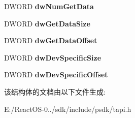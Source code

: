 \begin{DoxyCompactItemize}
\mbox{\label{structphonecaps__tag_ad605900d64527910c035e6764a85fa90}} 
D\+W\+O\+RD {\bfseries dw\+Num\+Get\+Data}
\item 
\mbox{\label{structphonecaps__tag_a48dd154d26c20254d583b17dc4f31eed}} 
D\+W\+O\+RD {\bfseries dw\+Get\+Data\+Size}
\item 
\mbox{\label{structphonecaps__tag_aa0b172be716dd7761552d176e5b92d79}} 
D\+W\+O\+RD {\bfseries dw\+Get\+Data\+Offset}
\item 
\mbox{\label{structphonecaps__tag_a42b0d251762eb7d02e70a40b57c217f7}} 
D\+W\+O\+RD {\bfseries dw\+Dev\+Specific\+Size}
\item 
\mbox{\label{structphonecaps__tag_ab4fb8a2817180ae0f39b5f23c543aaf0}} 
D\+W\+O\+RD {\bfseries dw\+Dev\+Specific\+Offset}
\end{DoxyCompactItemize}


该结构体的文档由以下文件生成\+:\begin{DoxyCompactItemize}
\item 
E\+:/\+React\+O\+S-\/0../sdk/include/psdk/tapi.\+h\end{DoxyCompactItemize}
